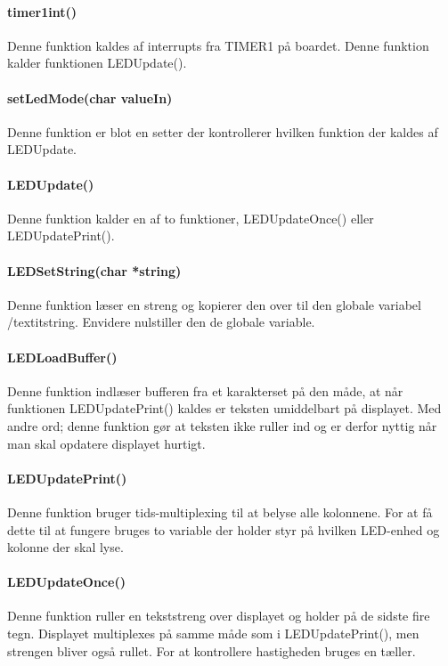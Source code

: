 \paragraph{timer1int()}
Denne funktion kaldes af interrupts fra TIMER1 på boardet. Denne funktion kalder funktionen LEDUpdate().

\paragraph{setLedMode(char valueIn)}
Denne funktion er blot en setter der kontrollerer hvilken funktion der kaldes af LEDUpdate.

\paragraph{LEDUpdate()}
Denne funktion kalder en af to funktioner, LEDUpdateOnce() eller LEDUpdatePrint().

\paragraph{LEDSetString(char *string)}
Denne funktion læser en streng  og kopierer den over til den globale variabel /textit{string}. Envidere nulstiller den de globale variable.

\paragraph{LEDLoadBuffer()}
Denne funktion indlæser bufferen fra et karakterset på den måde, at når funktionen LEDUpdatePrint() kaldes er teksten umiddelbart på displayet. Med andre ord; denne funktion gør at teksten ikke ruller ind og er derfor nyttig når man skal opdatere displayet hurtigt.

\paragraph{LEDUpdatePrint()}
Denne funktion bruger tids-multiplexing til at belyse alle kolonnene. For at få dette til at fungere bruges to variable der holder styr på hvilken LED-enhed og kolonne der skal lyse.

\paragraph{LEDUpdateOnce()}
Denne funktion ruller en tekststreng over displayet og holder på de sidste fire tegn. Displayet multiplexes på samme måde som i LEDUpdatePrint(), men strengen bliver også rullet. For at kontrollere hastigheden bruges en tæller.



